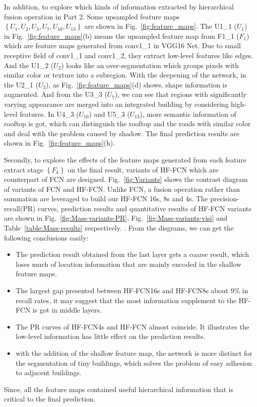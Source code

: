 In addition, to explore which kinds of information extracted by hierarchical fusion operation in Part 2.
Some upsampled feature maps ${\left\{U_1,U_2,U_3,U_7,U_{10},U_{13}\right\}}$ are shown in Fig.~\ref{fig:feature_maps}.
The U1\_1 (${U_1}$) in Fig.~\ref{fig:feature_maps}(b) means the upsampled feature map from F1\_1 (${F_1}$) which are feature maps generated from conv1\_1 in VGG16 Net.
Due to small receptive field of conv1\_1 and conv1\_2, they extract low-level features like edges.
And the U1\_2 (${U_2}$) looks like an over-segmentation which groups pixels with similar color or texture into a subregion.
With the deepening of the network, in the U2\_1 (${U_3}$), as Fig.~\ref{fig:feature_maps}(d) shows, shape information is augmented.
And from the U3\_3 (${U_7}$), we can see that regions with significantly varying appearance are merged into an integrated building by considering high-level features.
In U4\_3 (${U_{10}}$) and U5\_3 ($U_{13}$), more semantic information of rooftop is got, which can distinguish the rooftop and the roads with similar color and deal with the problem caused by shadow.
The final prediction results are shown in Fig.~\ref{fig:feature_maps}(h).

Secondly, to explore the effects of the feature maps generated from each feature extract stage ${\left\{F_k\right\}}$ on the final result, variants of HF-FCN which are counterpart of FCN are designed.
Fig.~\ref{fig:Variants} shows the contrast diagram of variants of FCN and HF-FCN.
Unlike FCN, a fusion operation rather than summation are leveraged to build our HF-FCN 16s, 8s and 4s.
The precision-recall(PR) curves, prediction results and quantitative results of HF-FCN variants are shown in Fig.~\ref{fig:Mass-variants-PR}, Fig.~\ref{fig:Mass-variants-visi} and Table~\ref{table:Mass-results} respectively. .
From the disgrams, we can get the following conclusions easily:
\begin{itemize}
 \item The prediction result obtained from the last layer gets a coarse result, which loses much of location information that are mainly encoded in the shallow feature maps. 
 \item The largest gap presented between HF-FCN16s and HF-FCN8s about 9{\%} in recall rates, it may suggest that the most information supplement to the HF-FCN is got in middle layers.
 \item The PR curves of HF-FCN4s and HF-FCN almost coincide. It illustrates the low-level information has little effect on the prediction results.
 \item with the addition of the shallow feature map, the network is more distinct for the segmentation of tiny buildings, which solves the problem of easy adhesion to adjacent buildings.
\end{itemize}
Since, all the feature maps contained useful hierarchical information that is critical to the final prediction.

